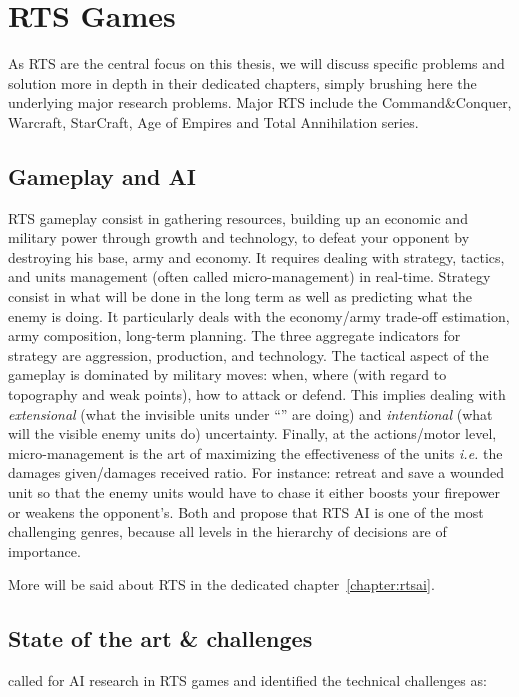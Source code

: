 
\section{RTS Games}
As RTS are the central focus on this thesis, we will discuss specific problems and solution more in depth in their dedicated chapters, simply brushing here the underlying major research problems. Major RTS include the Command\&Conquer, Warcraft, StarCraft, Age of Empires and Total Annihilation series.

\subsection{Gameplay and AI}
RTS gameplay consist in gathering resources, building up an economic and military power through growth and technology, to defeat your opponent by destroying his base, army and economy. It requires dealing with strategy, tactics, and units management (often called micro-management) in real-time. Strategy consist in what will be done in the long term as well as predicting what the enemy is doing. It particularly deals with the economy/army trade-off estimation, army composition, long-term planning. The three aggregate indicators for strategy are aggression, production, and technology. The tactical aspect of the gameplay is dominated by military moves: when, where (with regard to topography and weak points), how to attack or defend. This implies dealing with \textit{extensional} (what the invisible units under ``'' are doing) and \textit{intentional} (what will the visible enemy units do) uncertainty. Finally, at the actions/motor level, micro-management is the art of maximizing the effectiveness of the units \textit{i.e.} the damages given/damages received ratio. For instance: retreat and save a wounded unit so that the enemy units would have to chase it either boosts your firepower or weakens the opponent's. Both \citep{Human-LevelAIKillerApplication} and \cite{gunn} propose that RTS AI is one of the most challenging genres, because all levels in the hierarchy of decisions are of importance.

More will be said about RTS in the dedicated chapter~\ref{chapter:rtsai}.

\subsection{State of the art \& challenges}
\citet{Buro04callfor} called for AI research in RTS games and identified the technical challenges as:%

